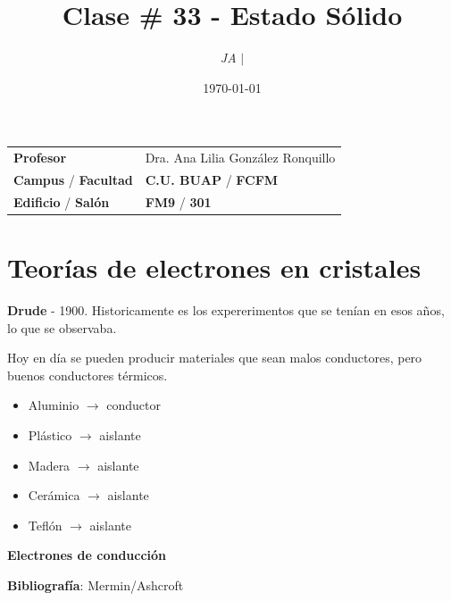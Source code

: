 \documentclass{article}
\title{Clase \# 33 - Estado Sólido}
\author{\emph{JA} $\boldsymbol{\mid}$}
\date{\today}
\begin{document}
\maketitle



\begin{mybox}
\noindent\begin{tabular}{@{}ll}
	{\bfseries{Profesor}} & Dra. Ana Lilia González Ronquillo\\
	\textcolor{prussianblue}{\bfseries{Campus}} / \textcolor{trueblue}{\bfseries{Facultad}}  & \textcolor{prussianblue}{\bfseries{C.U. BUAP}} /  \textcolor{trueblue}{\bfseries{FCFM}} \\
	\textcolor{prussianblue}{\bfseries{Edificio}} /  \textcolor{trueblue}{\bfseries{Salón}}    & 	\textcolor{prussianblue}{\bfseries{FM9}} /  \textcolor{trueblue}{\bfseries{301}}   
\end{tabular} 
\end{mybox} \vspace{1cm}

\tableofcontents

\vspace{2cm}

\section{Teorías de electrones en cristales}


\textbf{Drude} - 1900. Historicamente es los expererimentos que se tenían en esos años, lo que se observaba.

Hoy en día se pueden producir materiales que sean malos conductores, pero buenos conductores térmicos.

\begin{itemize}
\item Aluminio $\to$ conductor\\
\item Plástico $\to$ aislante\\
\item Madera $\to$ aislante \\
\item Cerámica $\to$ aislante\\
\item Teflón $\to$ aislante
\end{itemize}


\textbf{Electrones de conducción} 

\textbf{Bibliografía}:  Mermin/Ashcroft
\end{document}
